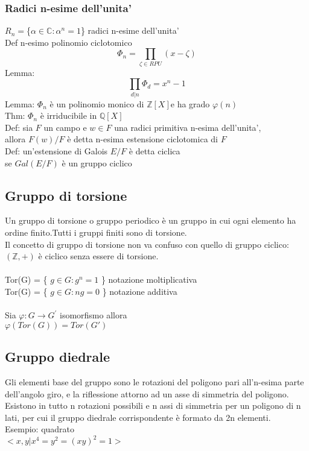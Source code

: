 \documentclass[10pt,a4paper]{article}
\begin{document}
\subsubsection{Radici n-esime dell'unita'}
$R_n = $\{$\alpha \in \mathbb{C} : \alpha^n =  1$\} radici n-esime dell'unita'\\
Def n-esimo polinomio ciclotomico
$$\Phi_n = \prod_{\zeta \in RPU}(x-\zeta)$$
Lemma:
$$\prod_{d|n}\Phi_d = x^n-1$$
Lemma: $\Phi_n$ è un polinomio monico di $\mathbb{Z}[X]$e ha grado $\varphi(n)$\\
Thm: $\Phi_n$ è irriducibile in $\mathbb{Q}[X]$\\
Def: sia $F$ un campo e $w \in F$ una radici primitiva n-esima dell'unita',\\
allora $F(w)/F$ è detta n-esima estensione ciclotomica di $F$\\
Def: un'estensione di Galois $E/F$ è detta ciclica\\
 se $Gal(E/F)$ è un gruppo ciclico


\subsection{Gruppo di torsione}
Un gruppo di torsione o gruppo periodico è un gruppo in cui ogni elemento ha ordine finito.Tutti i gruppi finiti sono di torsione.\\
Il concetto di gruppo di torsione non va confuso con quello di gruppo ciclico:\\$(\mathbb{Z},+)$ è ciclico senza essere di torsione.\\\\
Tor(G) = \{ $g\in G: g^n=1$ \} notazione moltiplicativa\\
Tor(G) = \{ $g\in G: ng=0$ \} notazione additiva\\\\
Sia $\varphi : G \to G^{'}$ isomorfismo allora\\
$\varphi(Tor(G)) = Tor(G{'})$

\subsection{Gruppo diedrale}
Gli elementi base del gruppo sono le rotazioni del poligono pari all'n-esima parte dell'angolo giro, e la riflessione attorno ad un asse di simmetria del poligono. Esistono in tutto n rotazioni possibili e n assi di simmetria per un poligono di n lati, per cui il gruppo diedrale corrispondente è formato da 2n elementi.\\
Esempio: quadrato\\
$<x,y | x^4=y^2=(xy)^2=1>$
\end{document}
